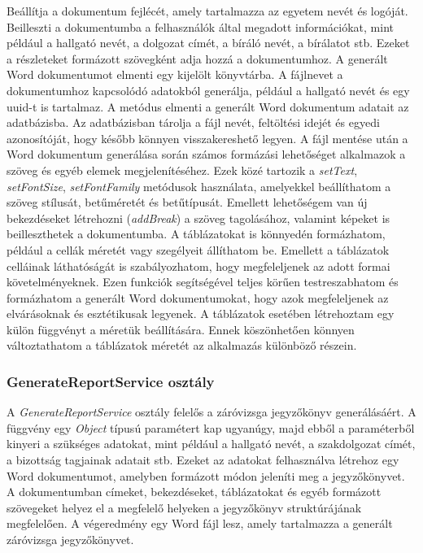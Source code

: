 Beállítja a dokumentum fejlécét, amely tartalmazza az egyetem nevét és logóját. Beilleszti a dokumentumba a felhasználók által megadott információkat, mint például a hallgató nevét, a dolgozat címét, a bíráló nevét, a bírálatot stb. Ezeket a részleteket formázott szövegként adja hozzá a dokumentumhoz. A generált Word dokumentumot elmenti egy kijelölt könyvtárba. A fájlnevet a dokumentumhoz kapcsolódó adatokból generálja, például a hallgató nevét és egy uuid-t is tartalmaz. A metódus elmenti a generált Word dokumentum adatait az adatbázisba. Az adatbázisban tárolja a fájl nevét, feltöltési idejét és egyedi azonosítóját, hogy később könnyen visszakereshető legyen. A fájl mentése után a Word dokumentum generálása során számos formázási lehetőséget alkalmazok a szöveg és egyéb elemek megjelenítéséhez. Ezek közé tartozik a \textit{setText}, \textit{setFontSize}, \textit{setFontFamily} metódusok használata, amelyekkel beállíthatom a szöveg stílusát, betűméretét és betűtípusát. Emellett lehetőségem van új bekezdéseket létrehozni (\textit{addBreak}) a szöveg tagolásához, valamint képeket is beilleszthetek a dokumentumba. A táblázatokat is könnyedén formázhatom, például a cellák méretét vagy szegélyeit állíthatom be. Emellett a táblázatok celláinak láthatóságát is szabályozhatom, hogy megfeleljenek az adott formai követelményeknek. Ezen funkciók segítségével teljes körűen testreszabhatom és formázhatom a generált Word dokumentumokat, hogy azok megfeleljenek az elvárásoknak és esztétikusak legyenek. A táblázatok esetében létrehoztam egy külön függvényt a méretük beállítására. Ennek köszönhetően könnyen változtathatom a táblázatok méretét az alkalmazás különböző részein.

\subsubsection{GenerateReportService osztály}

A \textit{GenerateReportService} osztály felelős a záróvizsga jegyzőkönyv generálásáért. A függvény egy \textit{Object} típusú paramétert kap ugyanúgy, majd ebből a paraméterből kinyeri a szükséges adatokat, mint például a hallgató nevét, a szakdolgozat címét, a bizottság tagjainak adatait stb. Ezeket az adatokat felhasználva létrehoz egy Word dokumentumot, amelyben formázott módon jeleníti meg a jegyzőkönyvet. A dokumentumban címeket, bekezdéseket, táblázatokat és egyéb formázott szövegeket helyez el a megfelelő helyeken a jegyzőkönyv struktúrájának megfelelően. A végeredmény egy Word fájl lesz, amely tartalmazza a generált záróvizsga jegyzőkönyvet.


